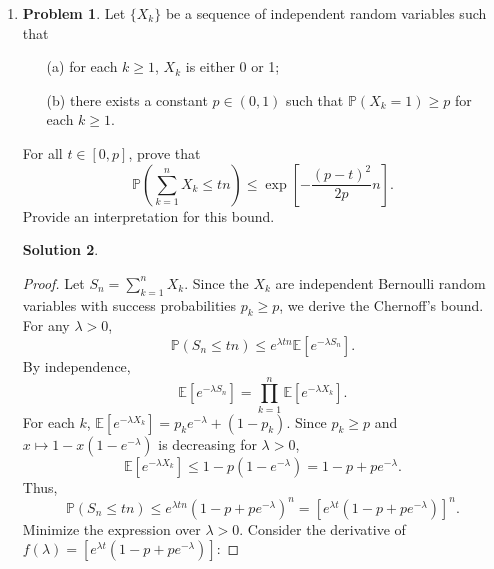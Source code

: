 \documentclass[12pt]{article}
\theoremstyle{definition}
\newtheorem*{solution}{\normalfont\textbf{Solution}}
\newtheorem*{Problem}{\noindent\textbf{Problem}}
\newcommand{\prob}{\mathbb{P}}
\newcommand{\E}{\mathbb{E}}
\begin{document}
\begin{enumerate}[leftmargin=*]
\begin{solution}
            Finally we show that  \( (0, 0) \) is not a global minimum.            Consider the point \( (2, 3) \):
            \[
            f(2, 3) = (2)^2 + (3)^2 (1 - 2)^3 = 4 + 9 \cdot (-1) = -5.
            \]
            Since \( f(0, 0) = 0 \) and \( f(2, 3) = -5 < 0 \), the value at \( (2, 3) \) is less than at \( (0, 0) \). Thus, \( (0, 0) \) is not a global minimizer.
        \end{solution}
    \item \begin{Problem}
            Let $\{X_k\}$ be a sequence of independent random variables such that
            \begin{enumerate}
                \item[(a)] for each $k \geq 1$, $X_k$ is either 0 or 1;
                \item[(b)] there exists a constant $p \in (0, 1)$ such that $\mathbb{P}(X_k = 1) \geq p$ for each $k \geq 1$.
            \end{enumerate}
            For all $t \in [0, p]$, prove that
            \[
            \mathbb{P}\left( \sum_{k=1}^n X_k \leq tn \right) \leq \exp\left[ -\frac{(p - t)^2}{2p} n \right].
            \]
            Provide an interpretation for this bound.
        \end{Problem}
        \begin{solution}
            \begin{proof}
                Let \(S_n = \sum_{k=1}^n X_k\). Since the \(X_k\) are independent Bernoulli random variables with success probabilities \(p_k \geq p\), we derive the Chernoff's bound. For any \(\lambda > 0\),
                \[
                \prob(S_n \leq tn) \leq e^{\lambda t n} \E[e^{-\lambda S_n}].
                \]
                By independence,
                \[
                \E[e^{-\lambda S_n}] = \prod_{k=1}^n \E[e^{-\lambda X_k}].
                \]
                For each \(k\), \(\E[e^{-\lambda X_k}] = p_k e^{-\lambda} + (1 - p_k)\). Since \(p_k \geq p\) and \(x \mapsto 1 - x(1 - e^{-\lambda})\) is decreasing for \(\lambda > 0\),
                \[
                \E[e^{-\lambda X_k}] \leq 1 - p(1 - e^{-\lambda}) = 1 - p + pe^{-\lambda}.
                \]
                Thus,
                \[
                \prob(S_n \leq tn) \leq e^{\lambda t n} (1 - p + pe^{-\lambda})^n = \left[ e^{\lambda t} (1 - p + pe^{-\lambda}) \right]^n.
                \]
                Minimize the expression over \(\lambda > 0\). Consider the derivative of \(f(\lambda) = \left[ e^{\lambda t} (1 - p + pe^{-\lambda}) \right]\):

\end{proof}
\end{solution}
\end{enumerate}
\end{document}
